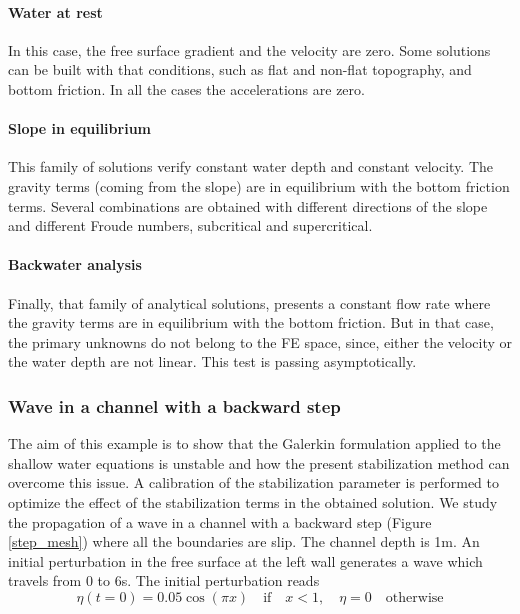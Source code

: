 \paragraph{Water at rest}
In this case, the free surface gradient and the velocity are zero. Some solutions can be built with that conditions, such as flat and non-flat topography, and bottom friction. In all the cases the accelerations are zero.

\paragraph{Slope in equilibrium}
This family of solutions verify constant water depth and constant velocity. The gravity terms (coming from the slope) are in equilibrium with the bottom friction terms. Several combinations are obtained with different directions of the slope and different Froude numbers, subcritical and supercritical.

\paragraph{Backwater analysis}
Finally, that family of analytical solutions, presents a constant flow rate where the gravity terms are in equilibrium with the bottom friction. But in that case, the primary unknowns do not belong to the FE space, since, either the velocity or the water depth are not linear. This test is passing asymptotically.




\subsubsection{Wave in a channel with a backward step}

The aim of this example is to show that the Galerkin formulation applied to the shallow water equations is unstable and how the present stabilization method can overcome this issue. A calibration of the stabilization parameter is performed to optimize the effect of the stabilization terms in the obtained solution.
We study the propagation of a wave in a channel with a backward step (Figure \ref{step_mesh}) where all the boundaries are slip. The channel depth is 1m. An initial perturbation in the free surface at the left wall generates a wave which travels from 0 to 6s. The initial perturbation reads
\begin{equation}
\eta(t=0) = 0.05\cos(\pi x) \quad \text{if} \quad x<1, \quad \eta=0 \quad \text{otherwise}
\end{equation}


